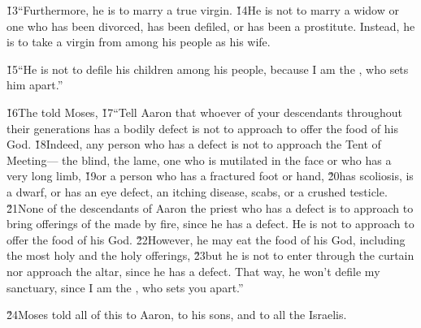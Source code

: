 \v{13}``Furthermore, he is to marry a true virgin. \v{14}He is not to marry a widow or one who has been divorced, has been defiled, or has been a prostitute. Instead, he is to take a virgin from among his people as his wife.

\v{15}``He is not to defile his children among his people, because I am the , who sets him apart.''

\v{16}The  told Moses, \v{17}``Tell Aaron that whoever of your descendants throughout their generations has a bodily defect is not to approach to offer the food of his God. \v{18}Indeed, any person who has a defect is not to approach the Tent of Meeting--- the blind, the lame, one who is mutilated in the face or who has a very long limb, \v{19}or a person who has a fractured foot or hand, \v{20}has scoliosis, is a dwarf, or has an eye defect, an itching disease, scabs, or a crushed testicle. \v{21}None of the descendants of Aaron the priest who has a defect is to approach to bring offerings of the  made by fire, since he has a defect. He is not to approach to offer the food of his God. \v{22}However, he may eat the food of his God, including the most holy and the holy offerings, \v{23}but he is not to enter through the curtain nor approach the altar, since he has a defect. That way, he won't defile my sanctuary, since I am the , who sets you apart.''

\v{24}Moses told all of this to Aaron, to his sons, and to all the Israelis.

